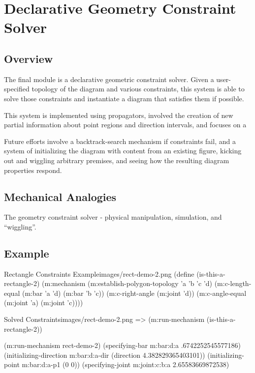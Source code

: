 \chapter{Declarative Geometry Constraint Solver}
\label{chap:declarative}

\section{Overview}

The final module is a declarative geometric constraint solver. Given
a user-specified topology of the diagram and various constraints, this
system is able to solve those constraints and instantiate a diagram
that satisfies them if possible.

This system is implemented using propagators, involved the creation of
new partial information about point regions and direction intervals,
and focuses on a

Future efforts involve a backtrack-search mechanism if constraints
fail, and a system of initializing the diagram with content from an
existing figure, kicking out and wiggling arbitrary premises, and
seeing how the resulting diagram properties respond.

\section{Mechanical Analogies}

The geometry constraint solver - physical manipulation, simulation,
and ``wiggling''.

\section{Example}
\begin{code-example}{Rectangle Constraints Example}{images/rect-demo-2.png}
(define (is-this-a-rectangle-2)
  (m:mechanism
   (m:establish-polygon-topology 'a 'b 'c 'd)
   (m:c-length-equal (m:bar 'a 'd)
                     (m:bar 'b 'c))
   (m:c-right-angle (m:joint 'd))
   (m:c-angle-equal (m:joint 'a)
                    (m:joint 'c))))
\end{code-example}

\begin{img-example}{Solved Constraints}{images/rect-demo-2.png}
=> (m:run-mechanism (is-this-a-rectangle-2))

(m:run-mechanism rect-demo-2)
(specifying-bar m:bar:d:a .6742252545577186)
(initializing-direction m:bar:d:a-dir (direction 4.382829365403101))
(initializing-point m:bar:d:a-p1 (0 0))
(specifying-joint m:joint:c:b:a 2.65583669872538)
\end{img-example}


